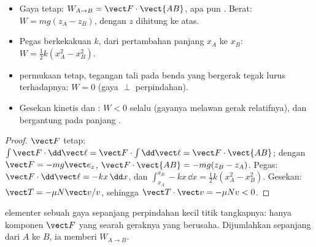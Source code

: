 \begin{proposition}\label{prop:b1:work-and-energy:works}
\begin{itemize}
  \item Gaya tetap: $W_{A\to B} = \vect F\cdot\vect{AB}$, apa pun
        . Berat: $W = mg(z_A - z_B)$, dengan $z$ dihitung ke atas.
  \item Pegas berkekakuan $k$, dari pertambahan panjang $x_A$ ke $x_B$:
        $W = \tfrac12 k(x_A^2 - x_B^2)$.
  \item {} permukaan tetap, tegangan tali pada benda yang
        bergerak tegak lurus terhadapnya: $W = 0$ (gaya $\perp$ perpindahan).
  \item Gesekan kinetis dan : $W < 0$ selalu (gayanya melawan
        gerak relatifnya), dan bergantung pada panjang .
\end{itemize}
\end{proposition}

\begin{proof}
$\vect F$ tetap: $\int\vect F\cdot\dd\vect\ell = \vect F\cdot\int\dd\vect\ell
= \vect F\cdot\vect{AB}$; dengan $\vect F = -mg\vect e_z$, $\vect F\cdot\vect{AB}
= -mg(z_B - z_A)$. Pegas: $\vect F\cdot\dd\vect\ell = -kx\,\dd x$, dan
$\int_{x_A}^{x_B}-kx\,\dd x = \tfrac12 k(x_A^2 - x_B^2)$. Gesekan: $\vect T
= -\mu N\vect v/v$, sehingga $\vect T\cdot\vect v = -\mu Nv < 0$.
\end{proof}

\begin{omfigure}

{\small {} elementer sebuah gaya sepanjang perpindahan kecil titik
tangkapnya: hanya komponen $\vect F$ yang searah geraknya yang berusaha.
Dijumlahkan sepanjang  dari $A$ ke $B$, ia memberi
$W_{A\to B}$.}
\end{omfigure}

